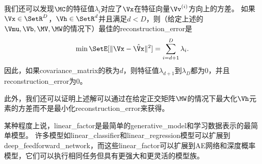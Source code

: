 我们还可以发现$\MC$的特征值$\lambda_i$对应了$\Vx$在特征向量$\Vv^{(i)}$方向上的方差。
如果$\Vx\in \SetR^D$，$\Vh\in\SetR^d$并且满足$d<D$，则（给定上述的${\Vmu},\Vb,\MV,\MW$的情况下）最佳的\gls{reconstruction_error}是
\begin{align}
\label{eqn:1323}
\min \SetE[\Vert \Vx - \hat{\Vx} \Vert^2] = \sum_{i=d+1}^{D}\lambda_i.
\end{align}
因此，如果\gls{covariance_matrix}的秩为$d$，则特征值$\lambda_{d+1}$到$\lambda_{D}$都为$0$，并且\gls{reconstruction_error}为$0$。

此外，我们还可以证明上述解可以通过在给定正交矩阵$\MW$的情况下最大化$\Vh$元素的方差而不是最小化\gls{reconstruction_error}来获得。


某种程度上说，\gls{linear_factor}是最简单的\gls{generative_model}和学习数据表示的最简单模型。
许多模型如\gls{linear_classifier}和\gls{linear_regression}模型可以扩展到\gls{deep_feedforward_network}，而这些\gls{linear_factor}可以扩展到\gls{AE}网络和深度概率模型，它们可以执行相同任务但具有更强大和更灵活的模型族。

